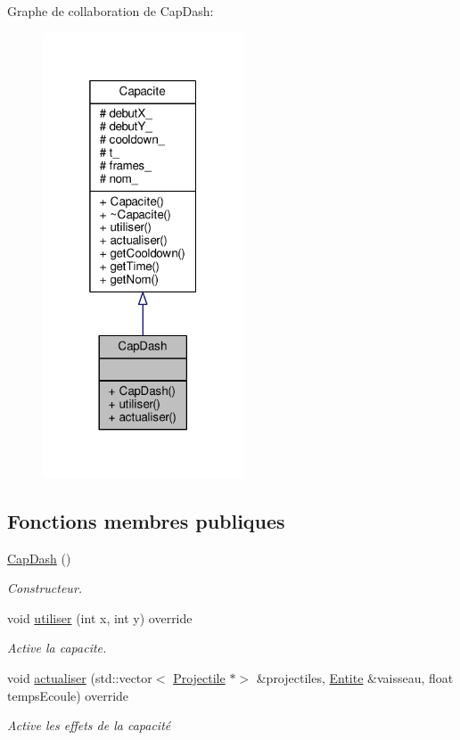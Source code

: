 Graphe de collaboration de Cap\+Dash\+:\nopagebreak
\begin{figure}[H]
\begin{center}
\leavevmode
\includegraphics[width=169pt]{class_cap_dash__coll__graph}
\end{center}
\end{figure}
\subsection*{Fonctions membres publiques}
\begin{DoxyCompactItemize}
\item 
\hyperlink{class_cap_dash_ac38287e31284b6b5ac8add730830bfed}{Cap\+Dash} ()
\begin{DoxyCompactList}\small\item\em Constructeur. \end{DoxyCompactList}\item 
void \hyperlink{class_cap_dash_a8a0fe26c8b13d8a9f6cf5a95d6559f3d}{utiliser} (int x, int y) override
\begin{DoxyCompactList}\small\item\em Active la capacite. \end{DoxyCompactList}\item 
void \hyperlink{class_cap_dash_a23e3009b85288e7aadce2eb2b581fac0}{actualiser} (std\+::vector$<$ \hyperlink{class_projectile}{Projectile} $\ast$$>$ \&projectiles, \hyperlink{class_entite}{Entite} \&vaisseau, float temps\+Ecoule) override
\begin{DoxyCompactList}\small\item\em Active les effets de la capacité \end{DoxyCompactList}\end{DoxyCompactItemize}
